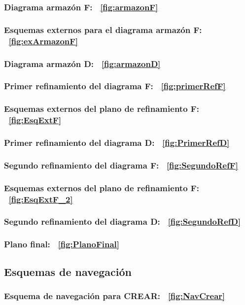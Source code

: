 \documentclass[paper=a4, fontsize=11pt, spanish]{scrartcl}
\begin{document}
\subsubsection* {Diagrama armazón F: ~\ref{fig:armazonF}}
\subsubsection* {Esquemas externos para el diagrama armazón F: ~\ref{fig:exArmazonF}}
\subsubsection* {Diagrama armazón D: ~\ref{fig:armazonD}}
\subsubsection* {Primer refinamiento del diagrama F: ~\ref{fig:primerRefF}}
\subsubsection* {Esquemas externos del plano de refinamiento F: ~\ref{fig:EsqExtF}}
\subsubsection* {Primer refinamiento del diagrama D: ~\ref{fig:PrimerRefD}}
\subsubsection* {Segundo refinamiento del diagrama F: ~\ref{fig:SegundoRefF}}
\subsubsection* {Esquemas externos del plano de refinamiento F: ~\ref{fig:EsqExtF_2}}
\subsubsection* {Segundo refinamiento del diagrama D: ~\ref{fig:SegundoRefD}}
\subsubsection* {Plano final: ~\ref{fig:PlanoFinal}}

\subsection {Esquemas de navegación}
\subsubsection* {Esquema de navegación para CREAR: ~\ref{fig:NavCrear}}
\end{document}

